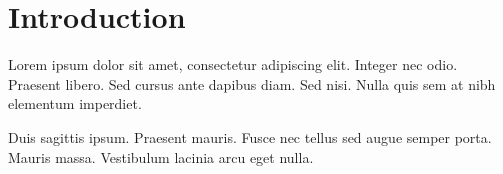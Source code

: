 \section{Introduction}

Lorem ipsum dolor sit amet, consectetur adipiscing elit. Integer nec odio. Praesent libero. Sed cursus ante dapibus diam. Sed nisi. Nulla quis sem at nibh elementum imperdiet.

Duis sagittis ipsum. Praesent mauris. Fusce nec tellus sed augue semper porta. Mauris massa. Vestibulum lacinia arcu eget nulla.
